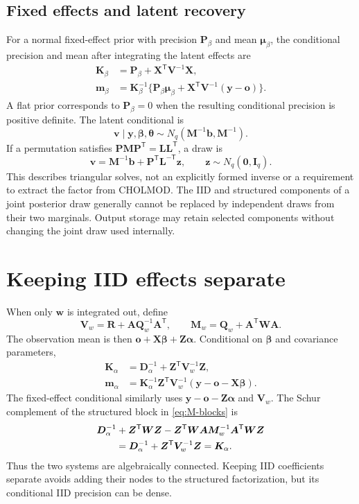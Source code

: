 \documentclass[11pt]{article}
\newcommand{\by}{\bm{y}}
\newcommand{\bo}{\bm{o}}
\newcommand{\bw}{\bm{w}}
\newcommand{\bv}{\bm{v}}
\newcommand{\bb}{\bm{b}}
\newcommand{\bz}{\bm{z}}
\newcommand{\balpha}{\bm{\alpha}}
\newcommand{\bbeta}{\bm{\beta}}
\newcommand{\btheta}{\bm{\theta}}
\newcommand{\bmu}{\bm{\mu}}
\newcommand{\bA}{\bm{A}}
\newcommand{\bD}{\bm{D}}
\newcommand{\bI}{\bm{I}}
\newcommand{\bK}{\bm{K}}
\newcommand{\bL}{\bm{L}}
\newcommand{\bM}{\bm{M}}
\newcommand{\bP}{\bm{P}}
\newcommand{\bQ}{\bm{Q}}
\newcommand{\bR}{\bm{R}}
\newcommand{\bV}{\bm{V}}
\newcommand{\bW}{\bm{W}}
\newcommand{\bX}{\bm{X}}
\newcommand{\bZ}{\bm{Z}}
\newcommand{\bzero}{\bm{0}}
\newcommand{\trans}{^{\mathsf T}}
\begin{document}
\subsection{Fixed effects and latent recovery}
For a normal fixed-effect prior with precision $\bP_\beta$ and mean $\bmu_\beta$,
the conditional precision and mean after integrating the latent effects are
\begin{align}
 \bK_\beta&=\bP_\beta+\bX\trans\bV^{-1}\bX,\\
 \bm{m}_\beta&=\bK_\beta^{-1}
 \{\bP_\beta\bmu_\beta+\bX\trans\bV^{-1}(\by-\bo)\}.
\end{align}
A flat prior corresponds to $\bP_\beta=0$ when the resulting conditional precision
is positive definite. The latent conditional is
\begin{equation}\label{eq:latent-recovery}
 \bv\mid\by,\bbeta,\btheta\sim N_q(\bM^{-1}\bb,\bM^{-1}).
\end{equation}
If a permutation satisfies $\bP\bM\bP\trans=\bL\bL\trans$, a draw is
\begin{equation}
 \bv=\bM^{-1}\bb+\bP\trans\bL^{-\mathsf T}\bz,
 \qquad \bz\sim N_q(\bzero,\bI_q).
\end{equation}
This describes triangular solves, not an explicitly formed inverse or a requirement
to extract the factor from CHOLMOD. The IID and structured components of a joint
posterior draw generally cannot be replaced by independent draws from their two
marginals. Output storage may retain selected components without changing the
joint draw used internally.

\section{Keeping IID effects separate}
When only $\bw$ is integrated out, define
\begin{equation}
 \bV_w=\bR+\bA\bQ_w^{-1}\bA\trans,\qquad
 \bM_w=\bQ_w+\bA\trans\bW\bA.
\end{equation}
The observation mean is then $\bo+\bX\bbeta+\bZ\balpha$. Conditional on
$\bbeta$ and covariance parameters,
\begin{align}
 \bK_\alpha&=\bD_\alpha^{-1}+\bZ\trans\bV_w^{-1}\bZ,\label{eq:alpha-conditional}\\
 \bm{m}_\alpha&=\bK_\alpha^{-1}\bZ\trans\bV_w^{-1}
 (\by-\bo-\bX\bbeta).
\end{align}
The fixed-effect conditional similarly uses $\by-\bo-\bZ\balpha$ and $\bV_w$.
The Schur complement of the structured block in \eqref{eq:M-blocks} is
\begin{align}
 &\bD_\alpha^{-1}+\bZ\trans\bW\bZ
 -\bZ\trans\bW\bA\bM_w^{-1}\bA\trans\bW\bZ\notag\\
 &\qquad=\bD_\alpha^{-1}+\bZ\trans\bV_w^{-1}\bZ
 =\bK_\alpha.\label{eq:schur}
\end{align}
Thus the two systems are algebraically connected. Keeping IID coefficients
separate avoids adding their nodes to the structured factorization, but its
conditional IID precision can be dense.
\end{document}
